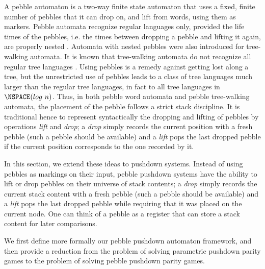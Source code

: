 \documentclass[a4paper,UKenglish,cleveref, autoref, thm-restate]{lipics-v2021}
\begin{document}
A pebble automaton is a two-way finite state automaton that uses a fixed, finite number of
pebbles that it can drop on, and lift from 
words, using them as markers.
Pebble automata recognize regular languages only, provided the life times of the pebbles, i.e. the times between dropping a pebble and lifting it again, are properly nested
\cite{globerman1996complexity, engelfriet1999tree}.
Automata with nested pebbles were also introduced
for tree-walking automata. 
It is known that tree-walking automata do not recognize all regular tree languages \cite{bojanczyk2008tree}%
.
Using pebbles is a remedy against getting lost along a tree, but 
the unrestricted use of pebbles leads to a class of tree languages much larger than the
regular tree languages, in fact to all tree languages in $\NSPACE(log ~ n)$.
Thus, in  both pebble word automata and pebble tree-walking automata, the placement of the pebble follows a strict stack discipline. It is traditional hence to represent syntactically the dropping and lifting of pebbles by operations \textit{lift} and \textit{drop}; a \textit{drop} simply records the current position with a fresh pebble (such a pebble should be available) %
and a \textit{lift} pops the last dropped pebble if the current position corresponds to the one recorded by it.




In this section, we extend these ideas to pushdown systems. Instead of using pebbles as markings on their input, pebble pushdown systems have the ability to lift or drop pebbles on their universe of stack contents; a \textit{drop} simply records the current stack content with a fresh pebble (such a pebble should be available) %
and a \textit{lift} pops the last dropped pebble 
while requiring that
 it was placed on the current node. 
One can think of a pebble as a register that can store a stack content for later comparisons.



We first define more formally our pebble pushdown automaton framework, and then provide a reduction from the problem of solving parametric pushdown parity games to the problem of solving pebble pushdown parity games.
\end{document}
